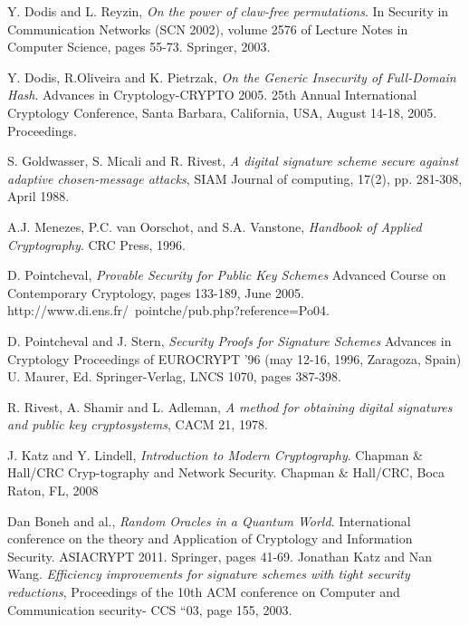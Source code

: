 \documentclass[a4paper,11pt]{article}
\begin{document}
\begin{thebibliography}{10}
 Y. Dodis and L. Reyzin, \emph{On the power of claw-free permutations}. In Security in Communication Networks (SCN 2002), volume 2576 of Lecture Notes in Computer Science, pages 55-73. Springer, 2003.


 Y. Dodis,  R.Oliveira and K. Pietrzak, \emph{On the Generic Insecurity of Full-Domain Hash}. Advances in Cryptology-CRYPTO 2005. 25th Annual International Cryptology Conference, Santa Barbara, California, USA, August 14-18, 2005. Proceedings.

 S. Goldwasser, S. Micali and R. Rivest, \emph{A digital signature scheme secure against
adaptive chosen-message attacks}, SIAM Journal of computing, 17(2), pp. 281-308, April 1988.

 A.J. Menezes, P.C. van Oorschot, and S.A. Vanstone, \emph{Handbook of Applied Cryptography}. CRC Press, 1996.

 D. Pointcheval, \emph{Provable Security for Public Key Schemes} Advanced Course on Contemporary Cryptology, pages 133-189, June 2005. http://www.di.ens.fr/~pointche/pub.php?reference=Po04.


 D. Pointcheval and J. Stern, \emph{Security Proofs for Signature Schemes} Advances in Cryptology  Proceedings of EUROCRYPT '96 (may 12-16, 1996, Zaragoza, Spain) U. Maurer, Ed. Springer-Verlag, LNCS 1070, pages 387-398.

 R. Rivest, A. Shamir and L. Adleman, \emph{A method for obtaining digital signatures and public key cryptosystems}, CACM 21, 1978.

 J. Katz and Y. Lindell, \emph{Introduction to Modern Cryptography}. Chapman $\&$ Hall/CRC Cryp-tography and Network Security. Chapman $\&$ Hall/CRC, Boca Raton, FL, 2008

Dan Boneh and al.,
\emph{Random Oracles in a Quantum World}.
International conference on the theory and Application of Cryptology and Information Security. ASIACRYPT 2011. Springer, pages 41-69.
Jonathan Katz and Nan Wang.
\emph{Efficiency improvements for signature schemes with tight security reductions}, Proceedings of the 10th ACM conference on Computer and Communication security- CCS ``03, page 155, 2003.
\end{thebibliography}
\end{document}
